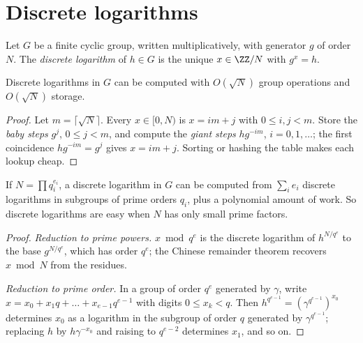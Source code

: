 \section{Discrete logarithms}\label{cryptography:section-discrete-log}

\begin{definition}\label{cryptography:definition-discrete-log}
Let $G$ be a finite cyclic group, written multiplicatively, with generator $g$ of order $N$. The \emph{discrete logarithm} of $h \in G$ is the unique $x \in \ZZ/N$ with $g^x = h$.
\end{definition}

\begin{proposition}\label{cryptography:proposition-bsgs}
Discrete logarithms in $G$ can be computed with $O(\sqrt N)$ group operations and $O(\sqrt N)$ storage.
\end{proposition}

\begin{proof}
Let $m = \lceil\sqrt N\rceil$. Every $x \in [0, N)$ is $x = im + j$ with $0 \leq i, j < m$. Store the \emph{baby steps} $g^j$, $0 \leq j < m$, and compute the \emph{giant steps} $hg^{-im}$, $i = 0, 1, \dots$; the first
coincidence $hg^{-im} = g^j$ gives $x = im + j$. Sorting or hashing the table makes each lookup cheap.
\end{proof}

\begin{proposition}\label{cryptography:proposition-pohlig-hellman}
If $N = \prod q_i^{e_i}$, a discrete logarithm in $G$ can be computed from $\sum_ie_i$ discrete logarithms in subgroups of prime orders $q_i$, plus a polynomial amount of work. So discrete logarithms are
easy when $N$ has only small prime factors.
\end{proposition}

\begin{proof}
\emph{Reduction to prime powers.} $x \bmod q^e$ is the discrete logarithm of $h^{N/q^e}$ to the base $g^{N/q^e}$, which has order $q^e$; the Chinese remainder theorem recovers $x \bmod N$ from the residues.

\emph{Reduction to prime order.} In a group of order $q^e$ generated by $\gamma$, write $x = x_0 + x_1q + \dots + x_{e-1}q^{e-1}$ with digits $0 \leq x_k < q$. Then $h^{q^{e-1}} = (\gamma^{q^{e-1}})^{x_0}$ determines
$x_0$ as a logarithm in the subgroup of order $q$ generated by $\gamma^{q^{e-1}}$; replacing $h$ by $h\gamma^{-x_0}$ and raising to $q^{e-2}$ determines $x_1$, and so on.
\end{proof}

